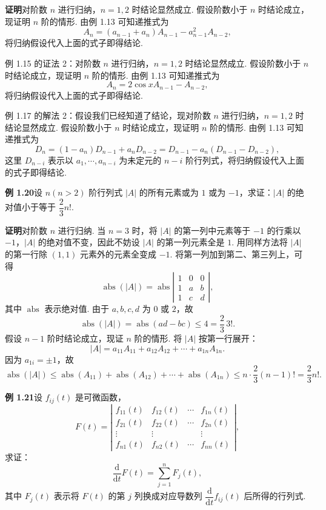 \documentclass[UTF8,12pt,a4paper,fontset=fandol]{ctexart}
\begin{document}
\noindent\textbf{证明}\quad 对阶数 $n$ 进行归纳，$n=1,2$ 时结论显然成立. 假设阶数小于 $n$ 时结论成立，现证明 $n$ 阶的情形. 由例 1.13 可知递推式为
\[
A_n=(a_{n-1}+a_n)A_{n-1}-a_{n-1}^2A_{n-2},
\]
将归纳假设代入上面的式子即得结论.

例 1.15 的证法 2：对阶数 $n$ 进行归纳，$n=1,2$ 时结论显然成立. 假设阶数小于 $n$ 时结论成立，现证明 $n$ 阶的情形. 由例 1.13 可知递推式为
\[
A_n=2\cos xA_{n-1}-A_{n-2},
\]
将归纳假设代入上面的式子即得结论.

例 1.17 的解法 2：假设我们已经知道了结论，现对阶数 $n$ 进行归纳，$n=1,2$ 时结论显然成立. 假设阶数小于 $n$ 时结论成立，现证明 $n$ 阶的情形. 由例 1.13 可知递推式为
\[
D_n=(1-a_n)D_{n-1}+a_nD_{n-2}=D_{n-1}-a_n(D_{n-1}-D_{n-2}),
\]
这里 $D_{n-i}$ 表示以 $a_1,\cdots,a_{n-i}$ 为未定元的 $n-i$ 阶行列式，将归纳假设代入上面的式子即得结论.

\noindent\textbf{例 1.20}\quad 设 $n(n>2)$ 阶行列式 $|A|$ 的所有元素或为 $1$ 或为 $-1$，求证：$|A|$ 的绝对值小于等于 $\dfrac23n!$.

\noindent\textbf{证明}\quad 对阶数 $n$ 进行归纳. 当 $n=3$ 时，将 $|A|$ 的第一列中元素等于 $-1$ 的行乘以 $-1$，$|A|$ 的绝对值不变，因此不妨设 $|A|$ 的第一列元素全是 $1$. 用同样方法将 $|A|$ 的第一行除 $(1,1)$ 元素外的元素全变成 $-1$. 将第一列加到第二、第三列上，可得
\[
\operatorname{abs}(|A|)
=\operatorname{abs}\left|\begin{array}{ccc}
1 & 0 & 0\\
1 & a & b\\
1 & c & d
\end{array}\right|,
\]
其中 $\operatorname{abs}$ 表示绝对值. 由于 $a,b,c,d$ 为 $0$ 或 $2$，故
\[
\operatorname{abs}(|A|)=\operatorname{abs}(ad-bc)\le4=\frac23\,3!.
\]
假设 $n-1$ 阶时结论成立，现证 $n$ 阶的情形. 将 $|A|$ 按第一行展开：
\[
|A|=a_{11}A_{11}+a_{12}A_{12}+\cdots+a_{1n}A_{1n}.
\]
因为 $a_{1i}=\pm1$，故
\[
\operatorname{abs}(|A|)
\le \operatorname{abs}(A_{11})+\operatorname{abs}(A_{12})+\cdots+\operatorname{abs}(A_{1n})
\le n\cdot\frac23(n-1)!=\frac23n!.
\]

\noindent\textbf{例 1.21}\quad 设 $f_{ij}(t)$ 是可微函数，
\[
F(t)=\left|\begin{array}{cccc}
f_{11}(t) & f_{12}(t) & \cdots & f_{1n}(t)\\
f_{21}(t) & f_{22}(t) & \cdots & f_{2n}(t)\\
\vdots & \vdots &        & \vdots\\
f_{n1}(t) & f_{n2}(t) & \cdots & f_{nn}(t)
\end{array}\right|,
\]
求证：
\[
\frac{\mathrm{d}}{\mathrm{d}t}F(t)=\sum_{j=1}^nF_j(t),
\]
其中 $F_j(t)$ 表示将 $F(t)$ 的第 $j$ 列换成对应导数列 $\dfrac{\mathrm{d}}{\mathrm{d}t}f_{ij}(t)$ 后所得的行列式.
\end{document}

